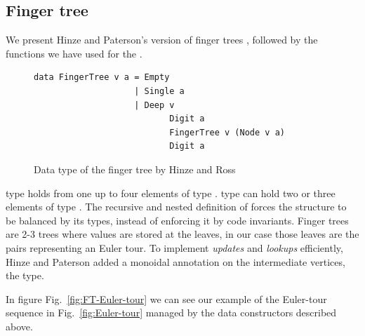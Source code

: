 \subsection{Finger tree} 

We present Hinze and Paterson's version of finger trees  \cite{FTs}, followed by the functions we have used for the .

\begin{figure}
\begin{lstlisting}
data FingerTree v a = Empty
                    | Single a 
                    | Deep v 
                           Digit a 
                           FingerTree v (Node v a) 
                           Digit a
\end{lstlisting}                           
\caption{Data type of the finger tree by Hinze and Ross}
\label{fig:FTdatatype}
\end{figure}



 type holds from one up to four elements of type .  type can hold two or three elements of type . The recursive and nested definition of  forces the structure to be balanced by its types, instead of enforcing it by code invariants. Finger trees are 2-3 trees where values are stored at the leaves, in our case those leaves are the pairs representing an Euler tour. To implement \textit{updates} and \textit{lookups} efficiently, Hinze and Paterson \cite{FTs} added a monoidal annotation on the intermediate vertices, the  type.

In figure Fig.~\ref{fig:FT-Euler-tour} we can see our example of the Euler-tour sequence in Fig.~\ref{fig:Euler-tour} managed by the data constructors described above.

